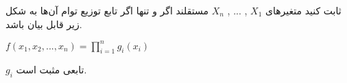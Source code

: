ثابت کنید متغیرهای
$ X_1 $
, ... ,
$ X_n $
مستقلند اگر و تنها اگر تابع توزیع توام آن‌ها به شکل زیر قابل بیان باشد.
\begin{center}
	$f( x_1, x_2, ..., x_n ) = \prod_{i=1}^n g_i(x_i)$
\end{center}
$ g_i $
تابعی مثبت است.